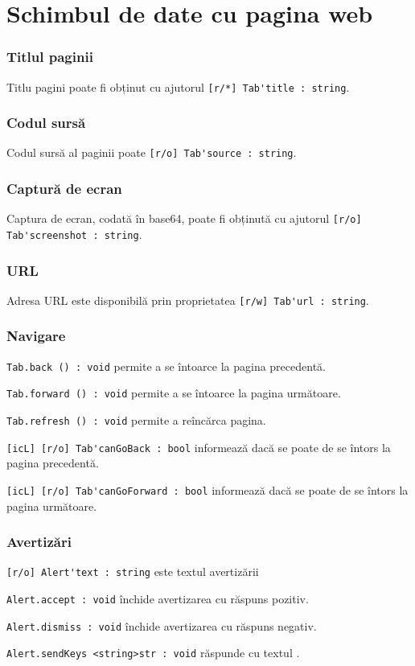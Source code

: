 \section{Schimbul de date cu pagina web}
\label{dataexchange}

\subsubsection{Titlul paginii}

Titlu pagini poate fi obținut cu ajutorul \lstinline|[r/*] Tab'title : string|.

\subsubsection{Codul sursă}

Codul sursă al paginii poate \lstinline|[r/o] Tab'source : string|.

\subsubsection{Captură de ecran}

Captura de ecran, codată în base64, poate fi obținută cu ajutorul \lstinline|[r/o] Tab'screenshot : string|.

\subsubsection{URL}

Adresa URL este disponibilă prin proprietatea \lstinline|[r/w] Tab'url : string|.

\subsubsection{Navigare}

\lstinline|Tab.back () : void| permite a se întoarce la pagina precedentă.

\lstinline|Tab.forward () : void| permite a se întoarce la pagina următoare.

\lstinline|Tab.refresh () : void|  permite a reîncărca pagina.

\lstinline|[icL] [r/o] Tab'canGoBack : bool| informează dacă se poate de se întors la pagina precedentă.

\lstinline|[icL] [r/o] Tab'canGoForward : bool| informează dacă se poate de se întors la pagina următoare.


\subsubsection{Avertizări}

\lstinline|[r/o] Alert'text : string| este textul avertizării

\lstinline|Alert.accept : void| închide avertizarea cu răspuns pozitiv.

\lstinline|Alert.dismiss : void| închide avertizarea cu răspuns negativ.

\lstinline|Alert.sendKeys <string>str : void| răspunde cu textul .

